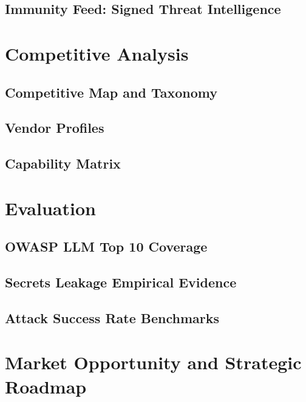 \documentclass[11pt,letterpaper]{article}
\begin{document}
\subsection{Immunity Feed: Signed Threat Intelligence}

\section{Competitive Analysis}

\subsection{Competitive Map and Taxonomy}

\subsection{Vendor Profiles}

\subsection{Capability Matrix}

\section{Evaluation}

\subsection{OWASP LLM Top 10 Coverage}

\subsection{Secrets Leakage Empirical Evidence}

\subsection{Attack Success Rate Benchmarks}

\section{Market Opportunity and Strategic Roadmap}
\end{document}
